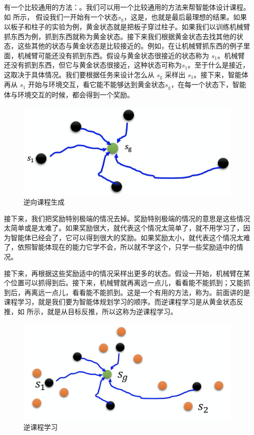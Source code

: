 有一个比较通用的方法：。我们可以用一个比较通用的方法来帮智能体设计课程。
如 所示，
假设我们一开始有一个状态$s_\mathrm{g}$，这是，也就是最后最理想的结果。如果以板子和柱子的实验为例，黄金状态就是把板子穿过柱子。如果我们以训练机械臂抓东西为例，抓到东西就称为黄金状态。接下来我们根据黄金状态去找其他的状态，这些其他的状态与黄金状态是比较接近的。例如，在让机械臂抓东西的例子里面，机械臂可能还没有抓到东西。假设与黄金状态很接近的状态称为 $s_1$。机械臂还没有抓到东西，但它与黄金状态很接近，这种状态可称为$s_1$。至于什么是接近，这取决于具体情况。我们要根据任务来设计怎么从 $s_\mathrm{g}$ 采样出 $s_1$。接下来，智能体再从 $s_1$ 开始与环境交互，看它能不能够达到黄金状态$s_\mathrm{g}$，在每一个状态下，智能体与环境交互的时候，都会得到一个奖励。

\begin{figure}[htb]
    \centering
    \includegraphics[width=0.5\linewidth]{res/ch10/10.7}
    \caption{逆向课程生成}
    \label{fig:fig10.7}
\end{figure}

接下来，我们把奖励特别极端的情况去掉。奖励特别极端的情况的意思是这些情况太简单或是太难了。如果奖励很大，就代表这个情况太简单了，就不用学习了，因为智能体已经会了，它可以得到很大的奖励。如果奖励太小，就代表这个情况太难了，依照智能体现在的能力它学不会，所以就不学这个，只学一些奖励适中的情况。

接下来，再根据这些奖励适中的情况采样出更多的状态。假设一开始，机械臂在某个位置可以抓得到后。接下来，机械臂就再离远一点儿，看看能不能抓到；又能抓到后，再离远一点儿，看看能不能抓到。这是一个有用的方法，称为。前面讲的是课程学习，就是我们要为智能体规划学习的顺序。而逆课程学习是从黄金状态反推，如 所示，就是从目标反推，所以这称为逆课程学习。  

\begin{figure}[htb]
    \centering
    \includegraphics[width=0.5\linewidth]{res/ch10/10.8}
    \caption{逆课程学习}
    \label{fig:fig10.8}
\end{figure}

